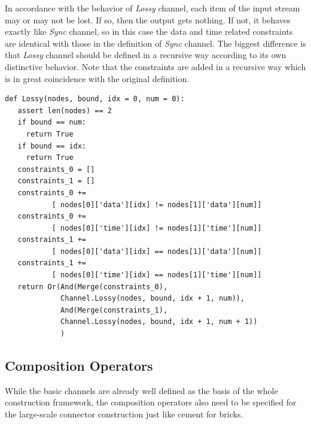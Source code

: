 \documentclass[3p,times]{elsarticle}
\begin{document}
In accordance with the behavior of \emph{Lossy} channel, each item of the input stream may or may not be lost. If so, then the output gets nothing. If not, it behaves exactly like \emph{Sync} channel, so in this case the data and time related constraints are identical with those in the definition of \emph{Sync} channel. The biggest difference is that \emph{Lossy} channel should be defined in a recursive way according to its own distinctive behavior. Note that the constraints are added in a recursive way which is in great coincidence with the original definition.
\begin{lstlisting}[frame=single]
def Lossy(nodes, bound, idx = 0, num = 0):
   assert len(nodes) == 2
   if bound == num:
     return True
   if bound == idx:
     return True
   constraints_0 = []
   constraints_1 = []
   constraints_0 +=
           [ nodes[0]['data'][idx] != nodes[1]['data'][num]]
   constraints_0 +=
           [ nodes[0]['time'][idx] != nodes[1]['time'][num]]
   constraints_1 +=
           [ nodes[0]['data'][idx] == nodes[1]['data'][num]]
   constraints_1 +=
           [ nodes[0]['time'][idx] == nodes[1]['time'][num]]
   return Or(And(Merge(constraints_0),
             Channel.Lossy(nodes, bound, idx + 1, num)),
             And(Merge(constraints_1),
             Channel.Lossy(nodes, bound, idx + 1, num + 1))
             )
\end{lstlisting}
\subsection{Composition Operators}
While the basic channels are already well defined as the basis of the whole construction framework, the composition operators also need to be specified for the large-scale connector construction just like cement for bricks.
\end{document}
